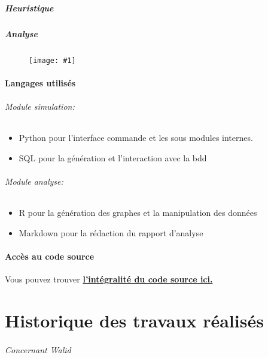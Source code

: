 \documentclass[
	headsepline=on,
	footsepline=on,
	twoside=off,
	abstract=on,
	DIV=10
]{scrreprt}
\newcommand{\img}[1]{
\begin{figure}[H]
	\centering
	\texttt{[image: \#1]}
\end{figure}
}
\begin{document}
			\subsubsection{Heuristique}
			
			\subsubsection{Analyse}
			\img{./pics/analyse_archi}
			\subsection{Langages utilisés}
			
			
				\paragraph{Module simulation:}
				\begin{itemize}
					\item Python pour l'interface commande et les sous modules internes.
					\item SQL pour la génération et l'interaction avec la bdd
				\end{itemize} 
				
				
				\paragraph{Module analyse:}
				\begin{itemize}
					\item R pour la génération des graphes et la manipulation des données
					\item Markdown pour la rédaction du rapport d'analyse
				\end{itemize}
			\subsection{Accès au code source}
			Vous pouvez trouver \href{https://github.com/helldragger/PolTron-La-coalition}{
			\bfseries \color{link} l'intégralité du code source ici.}
		\part{Historique des travaux réalisés}
		
		
		\paragraph{Concernant Walid}
		
\end{document}
